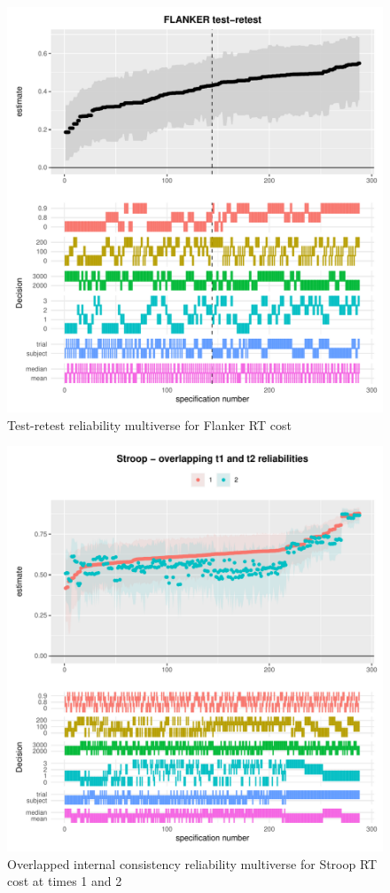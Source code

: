 \documentclass[
  english,
  man,floatsintext]{apa6}
\begin{document}
\begin{figure}
\centering
\includegraphics{half_trials_files/figure-latex/unnamed-chunk-6-1.pdf}
\caption{\label{fig:unnamed-chunk-6}Test-retest reliability multiverse for Flanker RT cost}
\end{figure}

\begin{figure}
\centering
\includegraphics{half_trials_files/figure-latex/unnamed-chunk-7-1.pdf}
\caption{\label{fig:unnamed-chunk-7}Overlapped internal consistency reliability multiverse for Stroop RT cost at times 1 and 2}
\end{figure}
\end{document}
